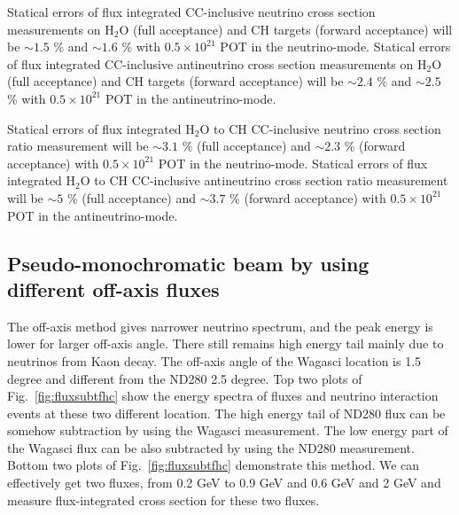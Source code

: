 Statical errors of flux integrated CC-inclusive neutrino cross section measurements on H$_{2}$O (full acceptance) and CH targets (forward acceptance)
will be $\sim 1.5$ \% and $\sim 1.6$ \% with $0.5\times 10^{21}$ POT in the neutrino-mode.
Statical errors of flux integrated CC-inclusive antineutrino cross section measurements on H$_{2}$O (full acceptance) and CH targets (forward acceptance)
will be $\sim 2.4$ \% and $\sim 2.5$ \% with $0.5\times 10^{21}$ POT in the antineutrino-mode.


Statical errors of flux integrated H$_{2}$O to CH CC-inclusive neutrino cross section ratio measurement 
will be $\sim 3.1$ \% (full acceptance) and $\sim 2.3$ \% (forward acceptance) with $0.5\times 10^{21}$ POT in the neutrino-mode.
Statical errors of flux integrated H$_{2}$O to CH CC-inclusive antineutrino cross section ratio measurement will be $\sim 5$ \% (full acceptance) and $\sim 3.7$ \% (forward acceptance) with $0.5\times 10^{21}$ POT in the antineutrino-mode.


\subsection{Pseudo-monochromatic beam by using different off-axis fluxes}
The off-axis method gives narrower neutrino spectrum, and the peak energy is lower for larger off-axis angle.
There still remains high energy tail mainly due to neutrinos from Kaon decay.
The off-axis angle of the Wagasci location is 1.5 degree and different from the ND280 2.5 degree.
Top two plots of Fig.~\ref{fig:fluxsubtfhc} show the energy spectra of fluxes and neutrino interaction events
at these two different location.
The high energy tail of ND280 flux can be somehow subtraction by using the Wagasci measurement.
The low energy part of the Wagasci flux can be also subtracted by using the ND280 measurement.
Bottom two plots of Fig.~\ref{fig:fluxsubtfhc} demonstrate this method.
We can effectively get two fluxes, from 0.2 GeV to 0.9 GeV and 0.6 GeV and 2 GeV
and measure flux-integrated cross section for these two fluxes.

